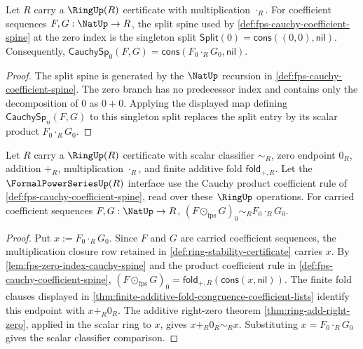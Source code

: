 \begin{lemma}\label{lem:fps-zero-index-cauchy-spine}
Let $R$ carry a $\RingUp(R)$ certificate with multiplication $\cdot_R$. For coefficient sequences $F,G:\NatUp\to R$, the split spine used by \autoref{def:fps-cauchy-coefficient-spine} at the zero index is the singleton split $\mathsf{Split}(0)=\mathsf{cons}((0,0),\mathsf{nil})$. Consequently, $\mathsf{CauchySp}_0(F,G)=\mathsf{cons}(F_0\cdot_R G_0,\mathsf{nil})$.
\end{lemma}
\begin{proof}
The split spine is generated by the $\NatUp$ recursion in \autoref{def:fps-cauchy-coefficient-spine}. The zero branch has no predecessor index and contains only the decomposition of $0$ as $0+0$. Applying the displayed map defining $\mathsf{CauchySp}_n(F,G)$ to this singleton split replaces the split entry by its scalar product $F_0\cdot_R G_0$.
\end{proof}
\begin{theorem}\label{thm:fps-cauchy-product-constant-coefficient}
Let $R$ carry a $\RingUp(R)$ certificate with scalar classifier $\sim_R$, zero endpoint $0_R$, addition $+_R$, multiplication $\cdot_R$, and finite additive fold $\mathsf{fold}_{+,R}$. Let the $\FormalPowerSeriesUp(R)$ interface use the Cauchy product coefficient rule of \autoref{def:fps-cauchy-coefficient-spine}, read over these $\RingUp$ operations. For carried coefficient sequences $F,G:\NatUp\to R$, $(F\odot_{\mathrm{fps}}G)_0\sim_R F_0\cdot_R G_0$.
\end{theorem}
\begin{proof}
Put $x:=F_0\cdot_R G_0$. Since $F$ and $G$ are carried coefficient sequences, the multiplication closure row retained in \autoref{def:ring-stability-certificate} carries $x$. By \autoref{lem:fps-zero-index-cauchy-spine} and the product coefficient rule in \autoref{def:fps-cauchy-coefficient-spine}, $(F\odot_{\mathrm{fps}}G)_0=\mathsf{fold}_{+,R}(\mathsf{cons}(x,\mathsf{nil}))$.
The finite fold clauses displayed in \autoref{thm:finite-additive-fold-congruence-coefficient-lists} identify this endpoint with $x+_R0_R$. The additive right-zero theorem \autoref{thm:ring-add-right-zero}, applied in the scalar ring to $x$, gives $x+_R0_R\sim_R x$. Substituting $x=F_0\cdot_R G_0$ gives the scalar classifier comparison.
\end{proof}

